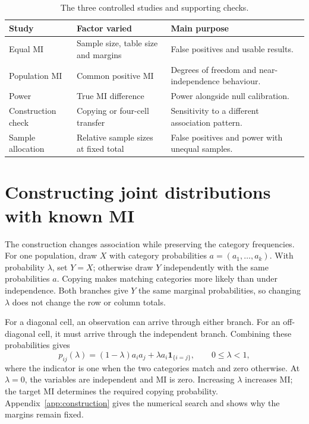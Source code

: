 \begin{table}[H]
\centering
\caption{The three controlled studies and supporting checks.}
\label{tab:design-families}
\begin{tabularx}{\textwidth}{@{}l>{\raggedright\arraybackslash}X>{\raggedright\arraybackslash}X@{}}
\toprule
Study & Factor varied & Main purpose\\
\midrule
Equal MI & Sample size, table size and margins & False positives and usable results.\\
Population MI & Common positive MI & Degrees of freedom and near-independence behaviour.\\
Power & True MI difference & Power alongside null calibration.\\
Construction check & Copying or four-cell transfer & Sensitivity to a different association pattern.\\
Sample allocation & Relative sample sizes at fixed total & False positives and power with unequal samples.\\
\bottomrule
\end{tabularx}
\end{table}

\section{Constructing joint distributions with known MI}

The construction changes association while preserving the category
frequencies. For one population, draw \(X\) with category probabilities
\(a=(a_1,\ldots,a_k)\). With probability \(\lambda\), set \(Y=X\);
otherwise draw \(Y\) independently with the same probabilities \(a\).
Copying makes matching categories more likely than under independence.
Both branches give \(Y\) the same marginal probabilities, so changing
\(\lambda\) does not change the row or column totals.

For a diagonal cell, an observation can arrive through either branch. For
an off-diagonal cell, it must arrive through the independent branch.
Combining these probabilities gives
\begin{equation}
 p_{ij}(\lambda)=(1-\lambda)a_i a_j
                  +\lambda a_i\mathbf{1}_{\{i=j\}},
 \qquad 0\leq\lambda<1,
 \label{eq:copying-construction}
\end{equation}
where the indicator is one when the two categories match and zero otherwise.
At \(\lambda=0\), the variables are independent and MI is zero.
Increasing \(\lambda\) increases MI; the target MI determines the required
copying probability. Appendix~\ref{app:construction} gives the numerical
search and shows why the margins remain fixed.

